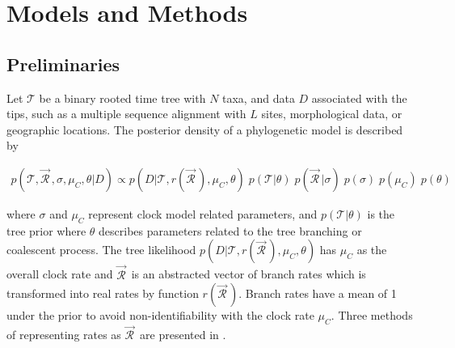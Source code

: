 \documentclass[10pt,letterpaper]{article}
\begin{document}










\section*{Models and Methods} \label{sect:models}



\subsection*{Preliminaries}



Let $\mathcal{T}$ be a binary rooted time tree with $N$ taxa, and %
data $D$ associated with the tips, such as a multiple sequence alignment with $L$ sites, morphological data, or geographic locations. 
The posterior density of a phylogenetic model is described by

\begin{eqnarray}
\label{eq:bayesian}
p(\mathcal{T}, \vec{\mathcal{R}}^{\,}, \sigma, \mu_C, \theta|D) \propto  p(D|\mathcal{T}, r(\vec{\mathcal{R}}^{\,}), \mu_C, \theta) \; p(\mathcal{T}|\theta) \;  p(\vec{\mathcal{R}}^{\,} | \sigma) \; p(\sigma) \; p(\mu_C) \; p(\theta)
\end{eqnarray}

\noindent
where $\sigma$ and $\mu_C$ represent clock model related parameters, and $p(\mathcal{T}|\theta)$ is the tree prior where $\theta$ describes parameters related to the tree branching or coalescent process. 
The tree likelihood $p(D|\mathcal{T}, r(\vec{\mathcal{R}}^{\,}), \mu_C,\theta)$ %
has $\mu_C$ as the overall clock rate and
$\vec{\mathcal{R}}^{\,}$ is an abstracted vector of branch rates which is transformed into real rates by function $r(\vec{\mathcal{R}}^{\,})$. 
Branch rates have a mean of 1 under the prior to avoid non-identifiability with the clock rate $\mu_C$.
Three methods of representing rates as $\vec{\mathcal{R}}^{\,}$ are presented in \textbf{}.  
\end{document}
